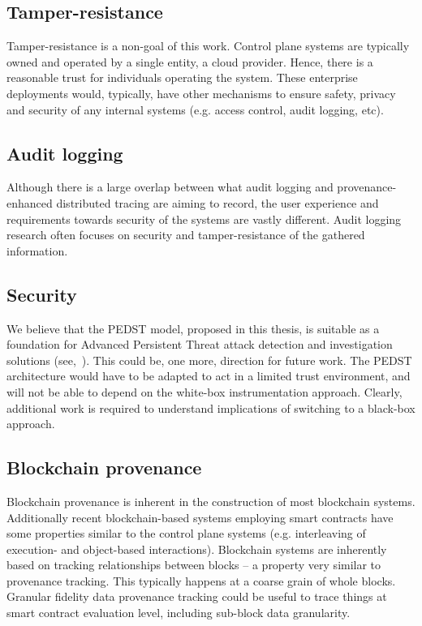 \subsection{Tamper-resistance}

Tamper-resistance is a non-goal of this work. Control plane systems are typically owned and operated by a single entity, a cloud provider. Hence, there is a reasonable trust for individuals operating the system. These enterprise deployments would, typically, have other mechanisms to ensure safety, privacy and security of any internal systems (e.g. access control, audit logging, etc).

\subsection{Audit logging}

Although there is a large overlap between what audit logging and provenance\hyp{}enhanced distributed tracing are aiming to record, the user experience and requirements towards security of the systems are vastly different. Audit logging research often focuses on security and tamper-resistance of the gathered information.

\subsection{Security}

We believe that the PEDST model, proposed in this thesis, is suitable as a foundation for Advanced Persistent Threat attack detection and investigation solutions (see,~\cite{apt-daly2009}). This could be, one more, direction for future work. The PEDST architecture would have to be adapted to act in a limited trust environment, and will not be able to depend on the white-box instrumentation approach. Clearly, additional work is required to understand implications of switching to a black-box approach.

\subsection{Blockchain provenance}

Blockchain provenance is inherent in the construction of most blockchain systems. Additionally recent blockchain-based systems employing smart contracts have some properties similar to the control plane systems (e.g. interleaving of execution- and object-based interactions). Blockchain systems are inherently based on tracking relationships between blocks -- a property very similar to provenance tracking. This typically happens at a coarse grain of whole blocks. Granular fidelity data provenance tracking could be useful to trace things at smart contract evaluation level, including sub-block data granularity.

